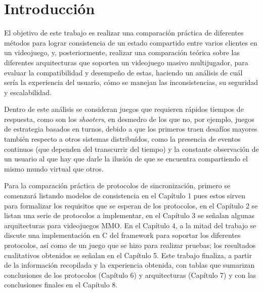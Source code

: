 \section*{Introducción}


El objetivo de este trabajo es realizar una comparación práctica de diferentes métodos para lograr consistencia de un estado compartido entre varios clientes en un videojuego, y, posteriormente, realizar una comparación teórica sobre las diferentes arquitecturas que soporten un videojuego masivo multijugador, para evaluar la compatibilidad y desempeño de estas, haciendo un análisis de cuál sería la experiencia del usuario, cómo se manejan las inconsistencias, su seguridad y escalabilidad.

Dentro de este análisis se consideran juegos que requieren rápidos tiempos de respuesta, como son los \emph{shooters}, en desmedro de los que no, por ejemplo, juegos de estrategia basados en turnos, debido a que los primeros traen desafíos mayores también respecto a otros sistemas distribuídos, como la presencia de eventos continuos (que dependen del transcurrir del tiempo) y la constante observación de un usuario al que hay que darle la ilusión de que se encuentra compartiendo el mismo mundo virtual que otros.

Para la comparación práctica de protocolos de sincronización, primero se comenzará listando modelos de consistencia en el Capítulo 1 pues estos sirven para formalizar los requisitos que se esperan de los protocolos, en el Capítulo 2 se listan una serie de protocolos a implementar, en el Capítulo 3 se señalan algunas arquitecturas para videojuegos MMO. En el Capítulo 4, a la mitad del trabajo se discute una implementación en C del framework para soportar los diferentes protocolos, así como de un juego que se hizo para realizar pruebas; los resultados cualitativos obtenidos se señalan en el Capítulo 5. Este trabajo finaliza, a partir de la información recopilada y la experiencia obtenida, con tablas que sumarizan conclusiones de los protocolos (Capítulo 6) y arquitecturas (Capítulo 7) y con las conclusiones finales en el Capítulo 8.

